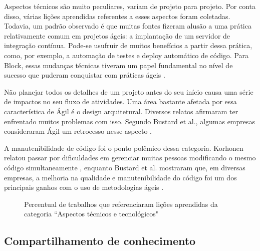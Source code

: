 Aspectos técnicos são muito peculiares, variam de projeto para projeto. Por conta disso, várias lições aprendidas referentes a esses aspectos foram coletadas. Todavia, um padrão observado é que muitas fontes fizeram alusão a uma prática relativamente comum em projetos ágeis: a implantação de um servidor de integração contínua. Pode-se usufruir de muitos benefícios a partir dessa prática, como, por exemplo, a automação de testes e deploy automático de código. Para Block, essas mudanças técnicas tiveram um papel fundamental no nível de sucesso que puderam conquistar com práticas ágeis \cite{Block2011}.

Não planejar todos os detalhes de um projeto antes do seu início causa uma série de impactos no seu fluxo de atividades. Uma área bastante afetada por essa característica de Ágil é o design arquitetural. Diversos relatos afirmaram ter enfrentado muitos problemas com isso. Segundo Bustard et al., algumas empresas consideraram Ágil um retrocesso nesse aspecto \cite{Bustard2013}.

A manutenibilidade de código foi o ponto polêmico dessa categoria. Korhonen relatou passar por dificuldades em gerenciar muitas pessoas modificando o mesmo código simultaneamente \cite{Nokia2013}, enquanto Bustard et al. mostraram que, em diversas empresas, a melhoria na qualidade e manutenibilidade do código foi um dos principais ganhos com o uso de metodologias ágeis \cite{Bustard2013}.

\begin{figure}[H]
	\centering
	\captionsetup{justification=centering}
	\caption{Percentual de trabalhos que referenciaram lições aprendidas da categoria ``Aspectos técnicos e tecnológicos"}
	\label{fig:tech}
\end{figure}

\subsection{Compartilhamento de conhecimento}

